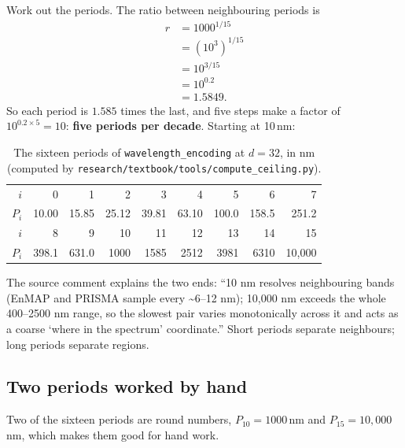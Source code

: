 Work out the periods. The ratio between neighbouring periods is
\begin{align*}
  r &= 1000^{1/15}\\
    &= \left(10^{3}\right)^{1/15}\\
    &= 10^{3/15}\\
    &= 10^{0.2}\\
    &= 1.5849 .
\end{align*}
So each period is $1.585$ times the last, and five steps make a factor of $10^{0.2\times5} = 10$: \textbf{five periods per decade}. Starting at 10\,nm:

\begin{table}[htbp]\centering
\caption{The sixteen periods of \texttt{wavelength\_encoding} at $d = 32$, in nm (computed by \texttt{research/textbook/tools/compute\_ceiling.py}).}\label{tab:ceiling:periods}
\begin{tabular}{rrrrrrrrr}\toprule
$i$ & 0 & 1 & 2 & 3 & 4 & 5 & 6 & 7\\
$P_i$ & 10.00 & 15.85 & 25.12 & 39.81 & 63.10 & 100.0 & 158.5 & 251.2\\\midrule
$i$ & 8 & 9 & 10 & 11 & 12 & 13 & 14 & 15\\
$P_i$ & 398.1 & 631.0 & 1000 & 1585 & 2512 & 3981 & 6310 & 10{,}000\\\bottomrule
\end{tabular}
\end{table}

The source comment explains the two ends: ``10 nm resolves neighbouring bands (EnMAP and PRISMA sample every \textasciitilde6--12 nm); 10,000 nm exceeds the whole 400--2500 nm range, so the slowest pair varies monotonically across it and acts as a coarse `where in the spectrum' coordinate.'' Short periods separate neighbours; long periods separate regions.

\subsection{Two periods worked by hand}

Two of the sixteen periods are round numbers, $P_{10} = 1000$\,nm and $P_{15} = 10{,}000$\,nm, which makes them good for hand work.

